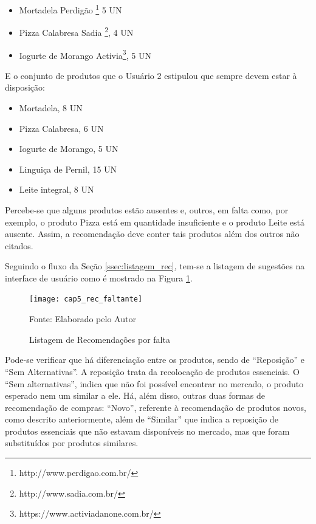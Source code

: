 \begin{itemize}[noitemsep,topsep=5pt]
    \item Mortadela Perdigão\textsuperscript{\textregistered} \footnote{http://www.perdigao.com.br/} 5 UN
    \item Pizza Calabresa Sadia\textsuperscript{\textregistered} \footnote{http://www.sadia.com.br/}, 4 UN
    \item Iogurte de Morango Activia\textsuperscript{\textregistered}\footnote{https://www.activiadanone.com.br/}, 5 UN
\end{itemize}

E o conjunto de produtos que o Usuário 2 estipulou que sempre devem estar à disposição:

\begin{itemize}[noitemsep,topsep=5pt]
    \item Mortadela, 8 UN
    \item Pizza Calabresa, 6 UN
    \item Iogurte de Morango, 5 UN
    \item Linguiça de Pernil, 15 UN
    \item Leite integral, 8 UN
\end{itemize}


Percebe-se que alguns produtos estão ausentes e, outros, em falta como, por exemplo, o produto Pizza está em quantidade insuficiente e o produto Leite está ausente. Assim, a recomendação deve conter tais produtos além dos outros não citados.

Seguindo o fluxo da Seção \ref{ssec:listagem_rec}, tem-se a listagem de sugestões na interface de usuário como é mostrado na Figura \ref{fig:cap5_rec_faltante}.

\begin{figure}[htb]
    \caption{Listagem de Recomendações por falta}
    \label{fig:cap5_rec_faltante}
    \texttt{[image: cap5\_rec\_faltante]}
    
    \footnotesize{Fonte: Elaborado pelo Autor}
\end{figure}


Pode-se verificar que há diferenciação entre os produtos, sendo de ``Reposição'' e ``Sem Alternativas''. A reposição trata da recolocação de produtos essenciais. O ``Sem alternativas'', indica que não foi possível encontrar no mercado, o produto esperado nem um similar a ele. Há, além disso, outras duas formas de recomendação de compras: ``Novo'', referente à recomendação de produtos novos, como descrito anteriormente, além de ``Similar'' que indica a reposição de produtos essenciais que não estavam disponíveis no mercado, mas que foram substituídos por produtos similares.

